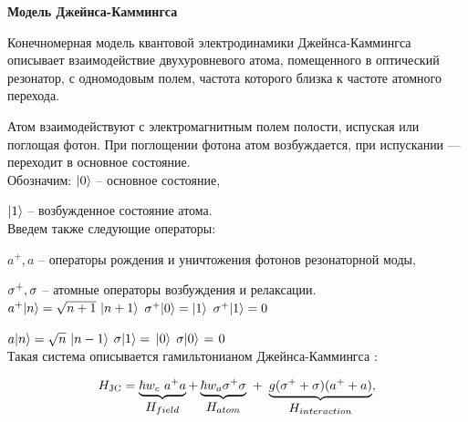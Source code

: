 \clearpage
\indent\textbf{Модель Джейнса-Каммингса}

Конечномерная модель квантовой электродинамики Джейнса-Каммингса описывает взаимодействие двухуровневого атома, помещенного в оптический резонатор, с одномодовым полем, частота которого близка к частоте атомного перехода.

\begin{figure}[h!]
	\noindent{}
\end{figure}

\noindent Атом взаимодействуют с электромагнитным полем полости, испуская или поглощая фотон. При поглощении фотона атом возбуждается, при испускании --- переходит в основное состояние. 
\\[12pt]
Обозначим:
$|0\rangle$ -- основное состояние,

\hspace{45pt}$|1\rangle$ -- возбужденное состояние атома.
\\[12pt]
Введем также следующие операторы:

\vspace{6pt}
\hspace{5pt}$a^{+}, a$ -- операторы рождения и уничтожения фотонов резонаторной моды,

\hspace{5pt}$\sigma^{+}, \sigma$ -- атомные операторы возбуждения и релаксации.
\\[1pt]

\hspace{6pt}$a^{+}|n\rangle = \sqrt{n+1}\ |n+1\rangle$
\hspace{33pt}$\sigma^{+}|0\rangle = |1\rangle$
\hspace{23pt}$\sigma^{+}|1\rangle = 0$

\hspace{15pt}$a|n\rangle = \sqrt{n}\ |n-1\rangle$
\hspace{70pt}$\sigma|1\rangle =\hspace{2pt}|0\rangle$
\hspace{32pt}$\sigma|0\rangle\hspace{1pt} = \hspace{1pt}0$
\\[18pt]
Такая система описывается гамильтонианом Джейнса-Каммингса \cite{jc_comparison,jc_qudit,jc_ladder,jc_descendants,jc_phase_transition}:
\begin{normalsize}
	\begin{equation}
		H_{\text{JC}} = \underbrace{\hbar w_{c}\ a^{+}a}_{\textstyle H_{field}} + \underbrace{\hbar w_{a}\s^{+}\s}_{\textstyle H_{atom}}~+~\underbrace{g(\s^{+}+\s)(a^{+}+a)}_{\textstyle H_{interaction}},
	\end{equation}
\end{normalsize}

